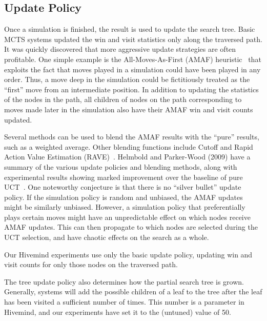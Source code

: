 \documentclass{acm_proc_article-sp}
\begin{document}
\subsection{Update Policy}
Once a simulation is finished, the result is used to update the search tree.
Basic MCTS systems updated the win and visit statistics only along the traversed path.
It was quickly discovered that more aggressive update strategies are often profitable.
One simple example is the All-Moves-As-First (AMAF) heuristic~\cite{brugmann1993monte}
that exploits the fact that moves played in a simulation could have been played in any order. 
Thus, a move deep in the simulation could be fictitiously treated as the ``first'' move from an intermediate position. 
In addition to updating the statistics of the nodes in the path, all children of nodes on the path corresponding to moves made later
in the simulation also have their AMAF win and visit counts updated. 

Several methods can be used to blend the AMAF results with the ``pure'' results, such as a weighted average.
Other blending functions include Cutoff and Rapid Action Value Estimation (RAVE)~\cite{chaslot2008progressive}. 
Helmbold and Parker-Wood (2009) have a summary of the various update policies and blending methods, along with experimental results showing marked improvement over the baseline of pure UCT~\cite{helmbold2009all}. 
One noteworthy conjecture is that there is no ``silver bullet'' update policy. If the simulation policy is random and unbiased, the AMAF updates might be similarly unbiased. However, a simulation policy that preferentially plays certain moves might have an unpredictable effect on which nodes receive AMAF updates. This can then propagate to which nodes are selected during the UCT selection, and have chaotic effects on the search as a whole. 

Our Hivemind experiments use only the basic update policy, updating win and visit counts for only those nodes on the traversed path.


The tree update policy also determines how the partial search tree is grown.
Generally, systems will add the possible children of a leaf to the tree after the leaf has been visited a sufficient number of times.
This number is a parameter in Hivemind, and our experiments have set it to the (untuned) value of 50.
\end{document}
